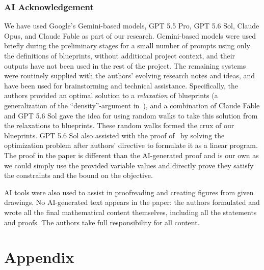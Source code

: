 \documentclass[11pt]{article}
\theoremstyle{definition}
\begin{document}
\section*{AI Acknowledgement} 
We have used Google's Gemini-based models, GPT 5.5 Pro, GPT 5.6 Sol, Claude Opus, and Claude Fable as part of our research. 
Gemini-based models were used briefly during the preliminary stages for a small number of prompts using only the definitions of blueprints, without additional project context, 
and their outputs have not been used in the rest of the project. 
The remaining systems were routinely supplied with the authors' evolving research notes and ideas, and 
have been used for brainstorming and technical assistance. Specifically, the authors provided an optimal solution to a \emph{relaxation} of blueprints (a generalization of the ``density''-argument in~),
and a combination of Claude Fable and GPT 5.6 Sol gave the idea for using random walks to take this solution from the relaxations 
to blueprints. These random walks formed the crux of our blueprints. 
GPT 5.6 Sol also assisted with the proof of~ by solving the optimization problem after authors' directive to formulate it as a linear program. The proof in the paper 
is different than the AI-generated proof and is our own as we could simply use the provided variable values and directly prove they satisfy the constraints and the bound on the objective. 

AI tools were also used to assist in proofreading and creating figures from given drawings. No AI-generated text appears in the paper: the authors formulated and wrote all the final mathematical content themselves, including all the statements and proofs.
The authors take full responsibility for all content. 





\clearpage
\appendix

\part*{Appendix}



\end{document}
